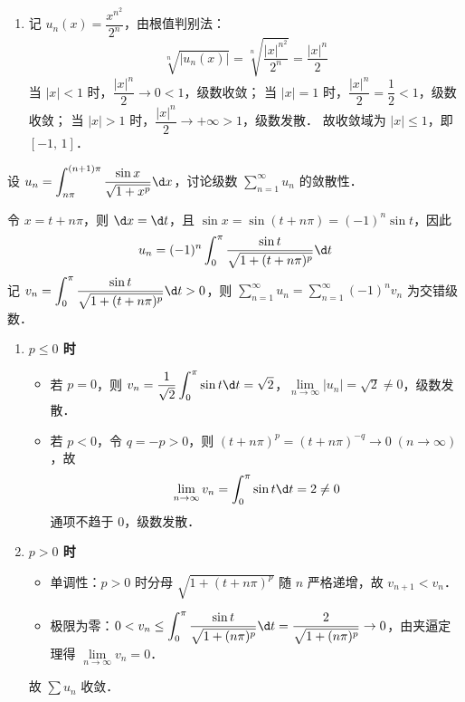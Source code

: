 \documentclass[12pt, a4paper, oneside, UTF8]{ctexbook}
\begin{document}
\begin{solution}
\begin{enumerate}[label=(\arabic*)]
        \item 记 $u_n(x) = \dfrac{x^{n^2}}{2^n}$，由根值判别法：
        \[ \sqrt[n]{|u_n(x)|} = \sqrt[n]{\frac{|x|^{n^2}}{2^n}} = \frac{|x|^n}{2} \]
        当 $|x| < 1$ 时，$\dfrac{|x|^n}{2} \to 0 < 1$，级数收敛；
        当 $|x| = 1$ 时，$\dfrac{|x|^n}{2} = \dfrac{1}{2} < 1$，级数收敛；
        当 $|x| > 1$ 时，$\dfrac{|x|^n}{2} \to +\infty > 1$，级数发散．
        故收敛域为 $|x| \le 1$，即 $\boxed{[-1,\,1]}$．
    \end{enumerate}
\end{solution}
\begin{exercise}
    设 $u_n = \displaystyle\int_{n\pi}^{(n+1)\pi} \frac{\sin x}{\sqrt{1+x^p}} \d x$，讨论级数 $\displaystyle\sum_{n=1}^{\infty} u_n$ 的敛散性．
\end{exercise}
\begin{solution}
    令 $x = t + n\pi$，则 $\d x = \d t$，且 $\sin x = \sin(t+n\pi) = (-1)^n \sin t$，因此
    \[ u_n = (-1)^n \int_0^{\pi} \frac{\sin t}{\sqrt{1+(t+n\pi)^p}} \d t \]
    记 $\displaystyle v_n = \int_0^{\pi} \frac{\sin t}{\sqrt{1+(t+n\pi)^p}} \d t > 0$，则 $\displaystyle\sum_{n=1}^{\infty} u_n = \sum_{n=1}^{\infty} (-1)^n v_n$ 为交错级数．

    \begin{enumerate}[label=\Roman*.]
        \item\textbf{$p \le 0$ 时}
        \begin{itemize}
            \item 若 $p = 0$，则 $v_n = \dfrac{1}{\sqrt{2}} \displaystyle\int_0^{\pi} \sin t \d t = \sqrt{2}$，$\lim\limits_{n\to\infty} |u_n| = \sqrt{2} \neq 0$，级数发散．
            \item 若 $p < 0$，令 $q = -p > 0$，则 $(t+n\pi)^p = (t+n\pi)^{-q} \to 0\;(n\to\infty)$，故
            \[ \lim_{n\to\infty} v_n = \int_0^{\pi} \sin t \d t = 2 \neq 0 \]
            通项不趋于 $0$，级数发散．
        \end{itemize}

        \item\textbf{$p > 0$ 时}
        \begin{itemize}
            \item 单调性：$p > 0$ 时分母 $\sqrt{1+(t+n\pi)^p}$ 随 $n$ 严格递增，故 $v_{n+1} < v_n$．
            \item 极限为零：$0 < v_n \le \displaystyle\int_0^{\pi} \frac{\sin t}{\sqrt{1+(n\pi)^p}} \d t = \frac{2}{\sqrt{1+(n\pi)^p}} \to 0$，由夹逼定理得 $\lim\limits_{n\to\infty} v_n = 0$．
        \end{itemize}
        故 $\sum u_n$ 收敛．


\end{enumerate}
\end{solution}
\end{document}
